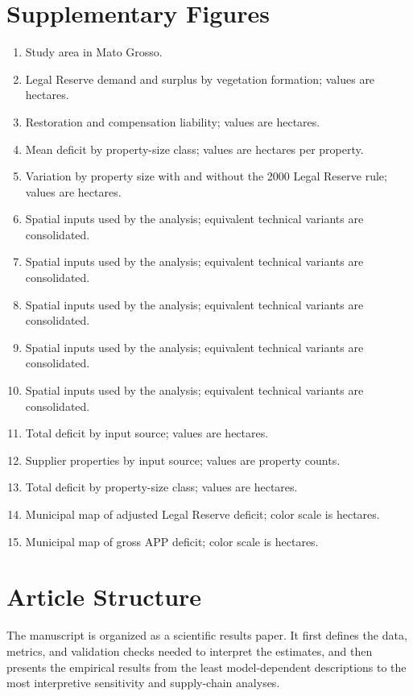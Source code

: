 \documentclass[12pt]{article}
\begin{document}
\section*{Supplementary Figures}
\begin{enumerate}
\item Study area in Mato Grosso.
\item Legal Reserve demand and surplus by vegetation formation; values are hectares.
\item Restoration and compensation liability; values are hectares.
\item Mean deficit by property-size class; values are hectares per property.
\item Variation by property size with and without the 2000 Legal Reserve rule; values are hectares.
\item Spatial inputs used by the analysis; equivalent technical variants are consolidated.
\item Spatial inputs used by the analysis; equivalent technical variants are consolidated.
\item Spatial inputs used by the analysis; equivalent technical variants are consolidated.
\item Spatial inputs used by the analysis; equivalent technical variants are consolidated.
\item Spatial inputs used by the analysis; equivalent technical variants are consolidated.
\item Total deficit by input source; values are hectares.
\item Supplier properties by input source; values are property counts.
\item Total deficit by property-size class; values are hectares.
\item Municipal map of adjusted Legal Reserve deficit; color scale is hectares.
\item Municipal map of gross APP deficit; color scale is hectares.
\end{enumerate}
\clearpage

\section*{Article Structure}
The manuscript is organized as a scientific results paper. It first defines the data, metrics, and validation checks needed to interpret the estimates, and then presents the empirical results from the least model-dependent descriptions to the most interpretive sensitivity and supply-chain analyses.
\end{document}
